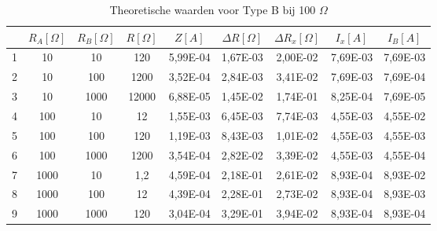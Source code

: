 \begin{table}[H]
    \centering
    \label{tab:TB1OO}
    \caption{Theoretische waarden voor Type B bij 100 $\Omega$}
    \begin{tabular}{| c | c | c | c | c | c | c | c | c |}
        \hline
                & $R_A [\Omega]$    & $R_B [\Omega]$    & $R [\Omega]$  & $Z [A]$   & $\Delta R [\Omega]$   & $\Delta R_x [\Omega]$ & $I_x [A]$                 & $I_B [A]$             \\ \hline
                1	&10	&10	&120	&5,99E-04	&1,67E-03	&2,00E-02	&7,69E-03	&7,69E-03 \\ \hline
                2	&10	&100	&1200	&3,52E-04	&2,84E-03	&3,41E-02	&7,69E-03	&7,69E-04\\ \hline
                3	&10	&1000	&12000	&6,88E-05	&1,45E-02	&1,74E-01	&8,25E-04	&7,69E-05\\ \hline
                4	&100	&10	&12	&1,55E-03	&6,45E-03	&7,74E-03	&4,55E-03	&4,55E-02\\ \hline
                5	&100	&100	&120	&1,19E-03	&8,43E-03	&1,01E-02	&4,55E-03	&4,55E-03\\ \hline
                6	&100	&1000	&1200	&3,54E-04	&2,82E-02	&3,39E-02	&4,55E-03	&4,55E-04\\ \hline
                7	&1000	&10	&1,2	&4,59E-04	&2,18E-01	&2,61E-02	&8,93E-04	&8,93E-02\\ \hline
                8	&1000	&100	&12	&4,39E-04	&2,28E-01	&2,73E-02	&8,93E-04	&8,93E-03\\ \hline
                9	&1000	&1000	&120	&3,04E-04	&3,29E-01	&3,94E-02	&8,93E-04	&8,93E-04     \\ \hline  
    \end{tabular}
\end{table}
